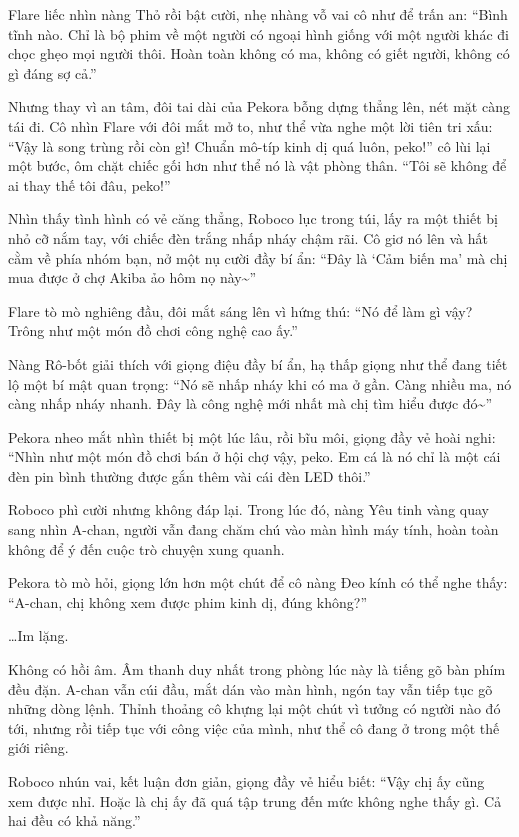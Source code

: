 \documentclass[../main.tex]{subfiles}
\begin{document}
Flare liếc nhìn nàng Thỏ rồi bật cười, nhẹ nhàng vỗ vai cô như để trấn an: ``Bình tĩnh nào. Chỉ là bộ phim về một người có ngoại hình giống với một người khác đi chọc ghẹo mọi người thôi. Hoàn toàn không có ma, không có giết người, không có gì đáng sợ cả.''

Nhưng thay vì an tâm, đôi tai dài của Pekora bỗng dựng thẳng lên, nét mặt càng tái đi. Cô nhìn Flare với đôi mắt mở to, như thể vừa nghe một lời tiên tri xấu: ``Vậy là song trùng rồi còn gì! Chuẩn mô-típ kinh dị quá luôn, peko!'' cô lùi lại một bước, ôm chặt chiếc gối hơn như thể nó là vật phòng thân. ``Tôi sẽ không để ai thay thế tôi đâu, peko!''

Nhìn thấy tình hình có vẻ căng thẳng, Roboco lục trong túi, lấy ra một thiết bị nhỏ cỡ nắm tay, với chiếc đèn trắng nhấp nháy chậm rãi. Cô giơ nó lên và hất cằm về phía nhóm bạn, nở một nụ cười đầy bí ẩn: ``Đây là `Cảm biến ma' mà chị mua được ở chợ Akiba ảo hôm nọ này\~{}''


Flare tò mò nghiêng đầu, đôi mắt sáng lên vì hứng thú: ``Nó để làm gì vậy? Trông như một món đồ chơi công nghệ cao ấy.''

Nàng Rô-bốt giải thích với giọng điệu đầy bí ẩn, hạ thấp giọng như thể đang tiết lộ một bí mật quan trọng: ``Nó sẽ nhấp nháy khi có ma ở gần. Càng nhiều ma, nó càng nhấp nháy nhanh. Đây là công nghệ mới nhất mà chị tìm hiểu được đó\~{}''

Pekora nheo mắt nhìn thiết bị một lúc lâu, rồi bĩu môi, giọng đầy vẻ hoài nghi: ``Nhìn như một món đồ chơi bán ở hội chợ vậy, peko. Em cá là nó chỉ là một cái đèn pin bình thường được gắn thêm vài cái đèn LED thôi.''

Roboco phì cười nhưng không đáp lại. Trong lúc đó, nàng Yêu tinh vàng quay sang nhìn A-chan, người vẫn đang chăm chú vào màn hình máy tính, hoàn toàn không để ý đến cuộc trò chuyện xung quanh.

Pekora tò mò hỏi, giọng lớn hơn một chút để cô nàng Đeo kính có thể nghe thấy: ``A-chan, chị không xem được phim kinh dị, đúng không?''

\dots Im lặng.

Không có hồi âm. Âm thanh duy nhất trong phòng lúc này là tiếng gõ bàn phím đều đặn. A-chan vẫn cúi đầu, mắt dán vào màn hình, ngón tay vẫn tiếp tục gõ những dòng lệnh. Thỉnh thoảng cô khựng lại một chút vì tưởng có người nào đó tới, nhưng rồi tiếp tục với công việc của mình, như thể cô đang ở trong một thế giới riêng.

Roboco nhún vai, kết luận đơn giản, giọng đầy vẻ hiểu biết: ``Vậy chị ấy cũng xem được nhỉ. Hoặc là chị ấy đã quá tập trung đến mức không nghe thấy gì. Cả hai đều có khả năng.''
\end{document}
